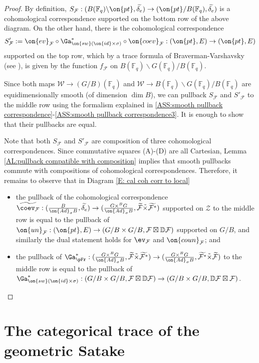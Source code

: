 \documentclass[11pt]{amsart}
\theoremstyle{definition}
\theoremstyle{definition}
\theoremstyle{definition}
\numberwithin{equation}{subsection}
\newcommand{\bD}{{\mathbb D}}
\newcommand{\bF}{{\mathbb F}}
\newcommand{\mF}{{\mathcal F}}
\newcommand{\mW}{{\mathcal W}}
\newcommand{\mZ}{{\mathcal Z}}
\newcommand{\Ad}{{\on{Ad}}}
\newcommand{\id}{{\on{id}}}
\begin{document}
\begin{proof}
By definition, $S_{\mF}: (B(\bF_q)\backslash \on{pt},\widetilde{\delta_e})\to (\on{pt}/B(\bF_q),\widetilde{\delta_e})$ is a cohomological correspondence supported on the bottom row of the above diagram. On the other hand, there is the cohomological correspondence 
$$S'_\mF:=\on{ev}_{\mF}\circ \Ga_{\on{sw}(\id\times\sigma)}^* \circ\on{coev}_{\mF}: (\on{pt},E)\to(\on{pt},E)$$ supported on the top row, which by a trace formula of Braverman-Varshavsky (see \cite[Lemma A.2.22]{XZ}), is given by the function $f_\mF$ on $B(\bF_q)\backslash G(\bF_q)/B(\bF_q)$.

Since both maps $\mW\to (G/B)(\bF_q)$ and $\mW\to B(\bF_q)\backslash G(\bF_q)/B(\bF_q)$ are equidimensionally smooth (of dimension $\dim B$), we can pullback $S_\mF$ and $S'_\mF$ to the middle row using the formalism explained in \eqref{ASS:smooth pullback correspondence}-\eqref{ASS:smooth pullback correspondence3}. It is enough to show that their pullbacks are equal.

Note that both $S_{\mF}$ and $S'_{\mF}$ are composition of three cohomological correspondences.
Since commutative squares (A)-(D) are all Cartesian, Lemma \ref{AL:pullback compatible with composition} implies that smooth pullbacks commute with compositions of cohomological correspondences. Therefore, it remains to observe that in Diagram \eqref{E: cal coh corr to local}
\begin{itemize}
\item
the pullback of the cohomological correspondence $\widetilde{\coev_\mF}: (\frac{B}{\Ad_\sigma B}, \widetilde{\delta_e})\to (\frac{G\times^BG}{\Ad_\sigma B}, \widetilde{\mF}\tilde\times \widetilde{\mF^*})$ supported on $\mZ$ to the middle row  is equal to the pullback of $\on{un}_{\mF}: (\on{pt},E)\to (G/B\times G/B, \mF\boxtimes \bD\mF)$ supported on $G/B$, and similarly the dual statement holds for $\ev_\mF$ and $\on{coun}_{\mF}$; and
\item the pullback of $\Ga_{\pFr}^*: (\frac{G\times^BG}{\Ad_\sigma B}, \widetilde{\mF}\tilde\times\widetilde{\mF^*})\to (\frac{G\times^BG}{\Ad_\sigma B}, \widetilde{\mF^*}\tilde\times\widetilde{\mF})$ to the middle row is equal to the pullback of $\Ga_{\on{sw}(\id\times\sigma)}^*: (G/B\times G/B, \mF\boxtimes \bD \mF)\to (G/B\times G/B, \bD \mF\boxtimes \mF)$.
\end{itemize}
\end{proof}


\section{The categorical trace of the geometric Satake}
\label{S: cattrSat}
\end{document}
